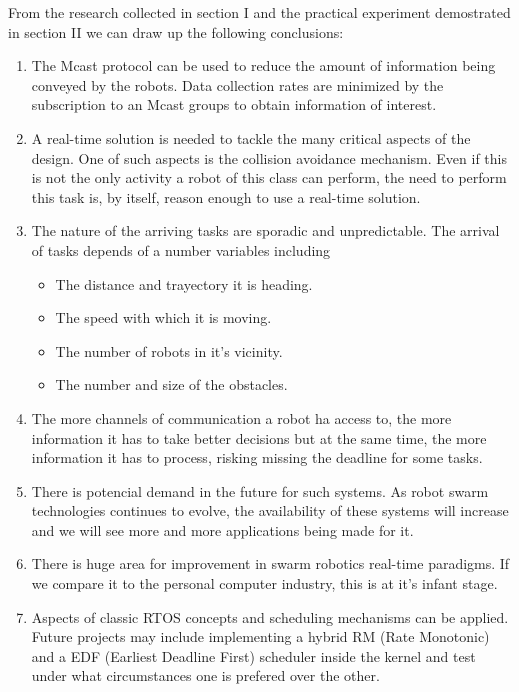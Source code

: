 \documentclass[journal]{IEEEtran}
\begin{document}
From the research collected in section I and the practical experiment demostrated in section II we can draw up the following conclusions:


\begin{enumerate}
\item The Mcast protocol can be used to reduce the amount of information being conveyed by the robots. Data collection rates are minimized by the subscription to an Mcast groups to obtain information of interest.

\item A real-time solution is needed to tackle the many critical aspects of the design. One of such aspects is the collision avoidance mechanism. Even if this is not the only activity a robot of this class can perform, the need to perform this task is, by itself, reason enough to use a real-time solution.

\item The nature of the arriving tasks are sporadic and unpredictable. The arrival of tasks depends of a number variables including

\begin{itemize}
\item The distance and trayectory it is heading.
\item The speed with which it is moving.
\item The number of robots in it's vicinity.
\item The number and size of the obstacles.
\end{itemize}

\item The more channels of communication a robot ha access to, the more information it has to take better decisions but at the same time, the more information it has to process, risking missing the deadline for some tasks.

\item There is potencial demand in the future for such systems. As robot swarm technologies continues to evolve, the availability of these systems will increase and we will see more and more applications being made for it.

\item There is huge area for improvement in swarm robotics real-time paradigms. If we compare it to the personal computer industry, this is at it's infant stage.

\item Aspects of classic RTOS concepts and scheduling mechanisms can be applied. Future projects may include implementing a hybrid RM (Rate Monotonic) and a EDF (Earliest Deadline First) scheduler inside the kernel and test under what circumstances one is prefered over the other.

\end{enumerate}
\end{document}
